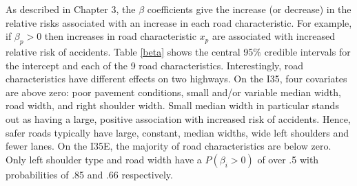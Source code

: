 As described in Chapter 3, the $\beta$ coefficients give the increase (or decrease) in the relative risks associated with an increase in each road characteristic. For example, if $\beta_p > 0$ then  increases in road characteristic $x_p$ are associated with increased relative risk of accidents. Table \ref{beta} shows the central 95\% credible intervals for the intercept and each of the 9 road characteristics. Interestingly, road characteristics have different effects on two highways. On the I35, four covariates are above zero: poor pavement conditions, small and/or variable median width, road width, and right shoulder width. Small median width in particular stands out as having a large, positive association with increased risk of accidents. Hence, safer roads typically have large, constant, median widths, wide left shoulders and fewer lanes. On the I35E, the majority of road characteristics are below zero. Only left shoulder type and road width have a $P(\beta_i>0)$ of over .5 with probabilities of .85 and .66 respectively.
